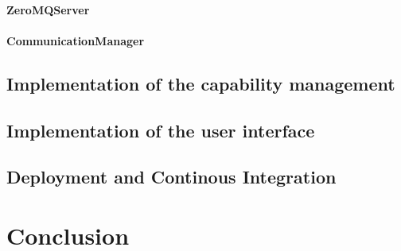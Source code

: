 
\paragraph{ZeroMQServer}

\paragraph{CommunicationManager}
\doit

\subsection{Implementation of the capability management}
\doit

\subsection{Implementation of the user interface}
\doit

\subsection{Deployment and Continous Integration}

\doit

\section{Conclusion}
\doit
